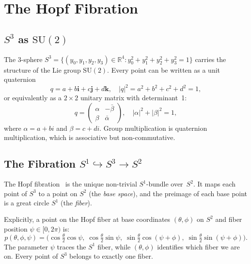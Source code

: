 \documentclass[12pt, a4paper]{article}
\theoremstyle{definition}
\theoremstyle{remark}
\newcommand{\Sthree}{S^3}
\newcommand{\Stwo}{S^2}
\newcommand{\Sone}{S^1}
\newcommand{\SU}{\mathrm{SU}(2)}
\newcommand{\R}{\mathbb{R}}
\begin{document}
\section{The Hopf Fibration}
\label{sec:hopf}

\subsection{$\Sthree$ as $\SU$}

The 3-sphere $\Sthree = \{(y_0, y_1, y_2, y_3) \in \R^4 : y_0^2 + y_1^2 +
y_2^2 + y_3^2 = 1\}$ carries the structure of the Lie group $\SU$. Every
point can be written as a unit quaternion
\begin{equation}
  q = a + b\mathbf{i} + c\mathbf{j} + d\mathbf{k},
  \quad |q|^2 = a^2 + b^2 + c^2 + d^2 = 1,
  \label{eq:quaternion}
\end{equation}
or equivalently as a $2\times 2$ unitary matrix with determinant~1:
\begin{equation}
  q = \begin{pmatrix} \alpha & -\bar{\beta} \\ \beta & \bar{\alpha}
  \end{pmatrix}, \quad |\alpha|^2 + |\beta|^2 = 1,
  \label{eq:su2matrix}
\end{equation}
where $\alpha = a + bi$ and $\beta = c + di$. Group multiplication is
quaternion multiplication, which is associative but non-commutative.

\subsection{The Fibration $\Sone \hookrightarrow \Sthree \to \Stwo$}

The Hopf fibration~\cite{hopf1931} is the unique non-trivial $\Sone$-bundle
over~$\Stwo$. It maps each point of $\Sthree$ to a point on $\Stwo$ (the
\emph{base space}), and the preimage of each base point is a great circle
$\Sone$ (the \emph{fiber}).

Explicitly, a point on the Hopf fiber at base coordinates $(\theta, \phi)$
on $\Stwo$ and fiber position $\psi \in [0, 2\pi)$ is:
\begin{equation}
  p(\theta, \phi, \psi) = \bigl(
    \cos\tfrac{\theta}{2}\cos\psi,\;
    \cos\tfrac{\theta}{2}\sin\psi,\;
    \sin\tfrac{\theta}{2}\cos(\psi+\phi),\;
    \sin\tfrac{\theta}{2}\sin(\psi+\phi)
  \bigr).
  \label{eq:hopf_fiber}
\end{equation}
The parameter $\psi$ traces the $\Sone$ fiber, while $(\theta, \phi)$
identifies which fiber we are on. Every point of $\Sthree$ belongs to
exactly one fiber.
\end{document}
